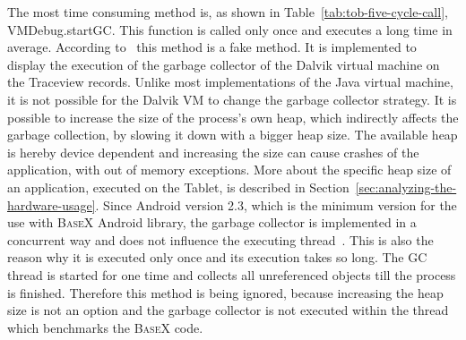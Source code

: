 The most time consuming method is, as shown in Table~\ref{tab:tob-five-cycle-call}, \textsf{VMDebug.startGC}.
This function is called only once and executes a long time in average.
According to~\cite{vmdebug-startgc} this method is a fake method. 
It is implemented to display the execution of the garbage collector of the Dalvik virtual machine on the Traceview records.
Unlike most implementations of the Java virtual machine, it is not possible for the Dalvik VM to change the garbage collector strategy.
It is possible to increase the size of the process's own heap, which indirectly affects the garbage collection, by slowing it down with a bigger heap size.
The available heap is hereby device dependent and increasing the size can cause crashes of the application, with out of memory exceptions.
More about the specific heap size of an application, executed on the Tablet, is described in Section~\ref{sec:analyzing-the-hardware-usage}.
Since Android version 2.3, which is the minimum version for the use with \textsc{BaseX} Android library, the garbage collector is implemented in a concurrent way and does not influence the executing thread~\cite{dubroy2011memory}.
This is also the reason why it is executed only once and its execution takes so long.
The GC thread is started for one time and collects all unreferenced objects till the process is finished.
Therefore this method is being ignored, because increasing the heap size is not an option and the garbage collector is not executed within the thread which benchmarks the \textsc{BaseX} code.

